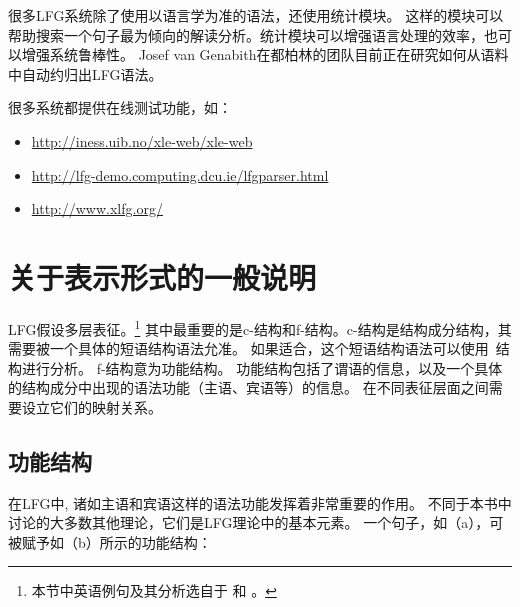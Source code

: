 很多LFG系统除了使用以语言学为准的语法，还使用统计模块。
这样的模块可以帮助搜索一个句子最为倾向的解读分析。统计模块可以增强语言处理的效率，也可以增强系统鲁棒性\citep{KRKMVC2004a-u,RKKCMJ2002a-u}。
Josef van Genabith在都柏林的团队目前正在研究如何从语料中自动约归出LFG语法\citep{JGCCR99a-u,DBCGW2005a-u,CBFDRCW2005a-u,CG2006a-u,GWG2007a-u,CBDRGW2008a-u,SvG2009a-u}。

很多系统都提供在线测试功能，如：
\begin{itemize}
\item \url{http://iness.uib.no/xle-web/xle-web}

\item \url{http://lfg-demo.computing.dcu.ie/lfgparser.html}
\item \url{http://www.xlfg.org/}
\end{itemize}

\section{关于表示形式的一般说明}

\label{Abschnitt-Format-LFG}

LFG假设多层表征。\footnote{%
  本节中英语例句及其分析选自于 \citet{Dalrymple2001a-u}和 \citet{Dalrymple2006a}。
}
其中最重要的是c-结构和f-结构。c-结构是结构成分结构，其需要被一个具体的短语结构语法允准。
如果适合，这个短语结构语法可以使用\xbarc~结构进行分析。
f-结构意为功能结构。
功能结构包括了谓语的信息，以及一个具体的结构成分中出现的语法功能（主语、宾语等）的信息。
在不同表征层面之间需要设立它们的映射关系。

\subsection{功能结构}

在LFG中, 诸如主语和宾语这样的语法功能发挥着非常重要的作用。
不同于本书中讨论的大多数其他理论，它们是LFG理论中的基本元素。
一个句子，如（a），可被赋予如（b）所示的功能结构：

\eal
{}
\ex {}
\zl

